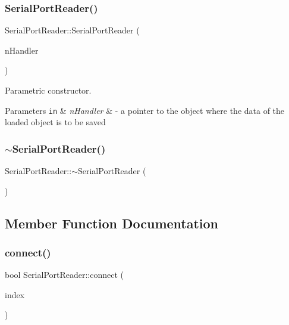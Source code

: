 \subsubsection{Serial\+Port\+Reader()}
{\footnotesize\ttfamily Serial\+Port\+Reader\+::\+Serial\+Port\+Reader (\begin{DoxyParamCaption}\item[{\textbf{ Measurement\+Handler} $\ast$}]{n\+Handler }\end{DoxyParamCaption})}



Parametric constructor. 


\begin{DoxyParams}[1]{Parameters}
\mbox{\tt in}  & {\em n\+Handler} & -\/ a pointer to the object where the data of the loaded object is to be saved \\
\hline
\end{DoxyParams}
\mbox{\label{class_serial_port_reader_a7f01c445adf0d64d8acd67cd4fcd3b21}} 
\subsubsection{$\sim$\+Serial\+Port\+Reader()}
{\footnotesize\ttfamily Serial\+Port\+Reader\+::$\sim$\+Serial\+Port\+Reader (\begin{DoxyParamCaption}{ }\end{DoxyParamCaption})}



\subsection{Member Function Documentation}
\mbox{\label{class_serial_port_reader_ad00028795b4f33ffb0a97cd76726c4fd}} 
\subsubsection{connect()}
{\footnotesize\ttfamily bool Serial\+Port\+Reader\+::connect (\begin{DoxyParamCaption}\item[{quint32}]{index }\end{DoxyParamCaption})}



